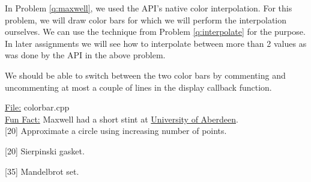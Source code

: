 \documentclass[addpoints]{exam}
\begin{document}
\begin{questions}
  \vspace{-25pt}In Problem \ref{q:maxwell}, we used the API's native color interpolation. For this problem, we will draw color bars for which we will perform the interpolation ourselves. We can use the technique from Problem \ref{q:interpolate} for the purpose. In later assignments we will see how to interpolate between more than 2 values as was done by the API in the above problem.
  We should be able to switch between the two color bars by commenting
  and uncommenting at most a couple of lines in the display callback
  function.
  
  \noindent\underline{File:} {colorbar.cpp}\\
  \underline{Fun Fact:} {Maxwell had a short stint at \href{https://www.abdn.ac.uk/museums/collections/james-clerk-maxwell-professor-and-physicist-457.php}{University of Aberdeen}.}\\
  
  [20]
  Approximate a circle using increasing number of points.

  [20]
  Sierpinski gasket.

  [35]
  Mandelbrot set.


  
  
\end{questions}
\end{document}
